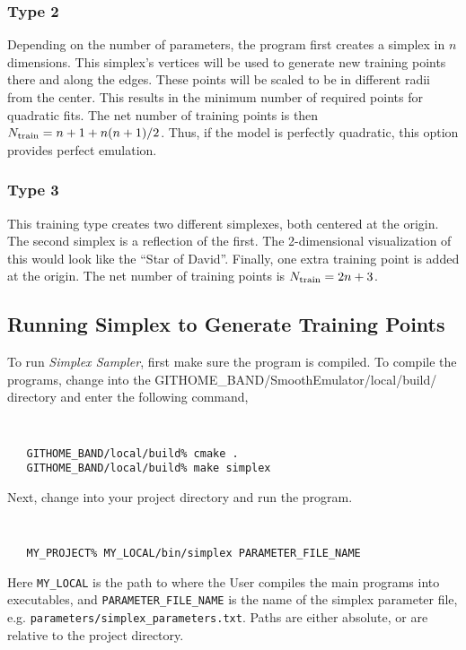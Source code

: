 \documentclass[UserManual.tex]{subfiles}
\begin{document}
\subsubsection{Type 2}

 Depending on the number of parameters, the program first creates a simplex in $n$ dimensions. This simplex's vertices will be used to generate new training points there and along the edges. These points will be scaled to be in different radii from the center. This results in the minimum number of required points for quadratic fits. The net number of training points is then $N_{\rm train}=n+1+n(n+1)/2$. Thus, if the model is perfectly quadratic, this option provides perfect emulation.
 
\subsubsection{Type 3}
This training type creates two different simplexes, both centered at the origin. The second simplex is a reflection of the first. The 2-dimensional visualization of this would look like the ``Star of David''.  Finally, one extra training point is added at the origin. The net number of training points is $N_{\rm train}=2n+3$.

\subsection{Running Simplex to Generate Training Points}

To run {\it Simplex Sampler}, first make sure the program is compiled. To compile the programs, change into the {GITHOME\_BAND/SmoothEmulator/local/build/} directory and enter the following command,
{\tt
\begin{verbatim}
   GITHOME_BAND/local/build% cmake .
   GITHOME_BAND/local/build% make simplex
\end{verbatim}
}
Next, change into your project directory and run the program.
{\tt
\begin{verbatim}
   MY_PROJECT% MY_LOCAL/bin/simplex PARAMETER_FILE_NAME
\end{verbatim}
}
Here {\tt MY\_LOCAL} is the path to where the User compiles the main programs into executables, and {\tt PARAMETER\_FILE\_NAME} is the name of the simplex parameter file, e.g. {\tt parameters/simplex\_parameters.txt}. Paths are either absolute, or are relative to the project directory. 
\end{document}
